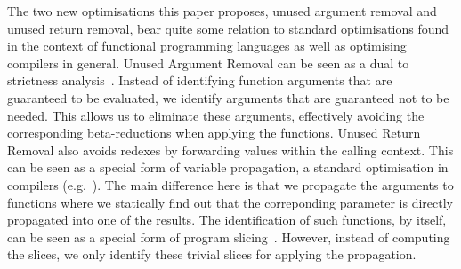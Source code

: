 The two new optimisations this paper proposes, unused argument removal and unused return removal, bear quite some relation to standard optimisations found in the context of functional programming languages as well as optimising compilers in general.
Unused Argument Removal can be seen as a dual to strictness analysis~\cite{SA-mycroft,SA-wadler}.
Instead of identifying function arguments that are guaranteed to be evaluated, we identify arguments that are guaranteed not to be needed.
This allows us to eliminate these arguments, effectively avoiding the corresponding beta-reductions when applying the functions. 
Unused Return Removal also avoids redexes by forwarding values within the calling context.
This can be seen as a special form of variable propagation, a standard optimisation in compilers (e.g.~\cite{AhoSethUllm86}).
The main difference here is that we propagate the arguments to functions where we statically find out that the correponding parameter is directly propagated into one of the results.
The identification of such functions, by itself, can be seen as a special form of program slicing~\cite{slicing}.
However, instead of computing the slices, we only identify these trivial slices for applying the propagation.
